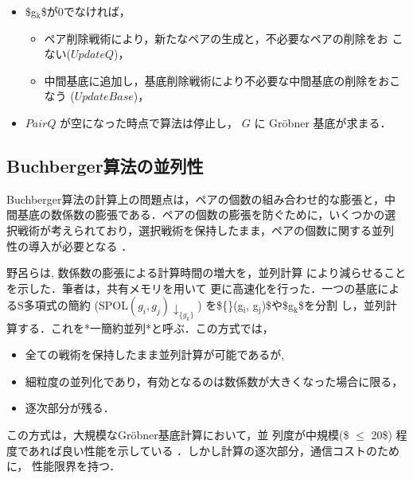 \documentclass[a4j]{jarticle}
\begin{document}
{{\begin{enumerate}
\begin{itemize}
\item \$g\(_{\text{k}}\)\$が0でなければ，

\begin{itemize}
\item ペア削除戦術により，新たなペアの生成と，不必要なペアの削除をお
こない(\(UpdateQ\))，

\item 中間基底に追加し，基底削除戦術により不必要な中間基底の削除をおこ
なう (\(UpdateBase\))，
\end{itemize}

\item \(PairQ\) が空になった時点で算法は停止し， \(G\) に Gröbner
基底が求まる．
\end{itemize}
\end{enumerate}

\subsection{Buchberger算法の並列性}
\label{sec:org139d3f0}

Buchberger算法の計算上の問題点は，ペアの個数の組み合わせ的な膨張と，中
間基底の数係数の膨張である．ペアの個数の膨張を防ぐために，いくつかの選
択戦術が考えられており，選択戦術を保持したまま，ペアの個数に関する並列
性の導入が必要となる \cite{strategy-accurate}．

野呂ら\cite{noro97-ap}は, 数係数の膨張による計算時間の増大を，並列計算
により減らせることを示した．筆者\cite{asir-para}は，共有メモリを用いて
更に高速化を行った．一つの基底によるS多項式の簡約
(\({{{\mathrm{SPOL}}(g_i, g_j)\!\downarrow_{\{g_k\}}}}\))
を\$\{\}(g\(_{\text{i}}\), g\(_{\text{j}}\))\$や\$g\(_{\text{k}}\)\$を分割
し，並列計算する．これを*一簡約並列*と呼ぶ．この方式では，

\begin{itemize}
\item 全ての戦術を保持したまま並列計算が可能であるが,

\item 細粒度の並列化であり，有効となるのは数係数が大きくなった場合に限る，

\item 逐次部分が残る．
\end{itemize}

この方式は，大規模なGröbner基底計算\cite{noro97-mckay}において，並
列度が中規模(\$ \(\le\) 20\$) 程度であれば良い性能を示している
\cite{noro97-ap,asir-para}．しかし計算の逐次部分，通信コストのために，
性能限界を持つ．

}}
\end{document}

